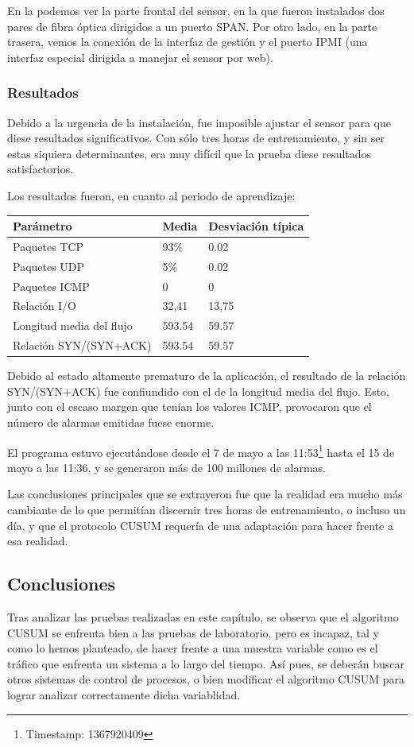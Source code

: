 En la  podemos ver la parte frontal del sensor, en la que fueron instalados dos pares de fibra 
óptica dirigidos a un puerto SPAN. Por otro lado, en la parte trasera, vemos la conexión de la interfaz de gestión y el 
puerto IPMI (una interfaz especial dirigida a manejar el sensor por web).

\subsubsection{Resultados}
Debido a la urgencia de la instalación, fue imposible ajustar el sensor para que diese resultados significativos. Con 
sólo tres horas de entrenamiento, y sin ser estas siquiera determinantes, era muy difícil que la prueba diese 
resultados satisfactorios.

Los resultados fueron, en cuanto al periodo de aprendizaje:
\begin{table}[htbp]
 \centering
 \begin {tabular}{lll}
  Parámetro & Media & Desviación típica  \\\hline
  Paquetes TCP & 93\% & 0.02 \\
  Paquetes UDP & 5\%  & 0.02 \\
  Paquetes ICMP & 0 & 0      \\
  Relación I/O & 32,41 & 13,75 \\
  Longitud media del flujo & 593.54 & 59.57 \\
  Relación SYN/(SYN+ACK) & 593.54 & 59.57   
 \end {tabular}
\end{table}

Debido al estado altamente prematuro de la aplicación, el resultado de la relación SYN/(SYN+ACK) fue confiundido con el 
de la longitud media del flujo. Esto, junto con el escaso margen que tenían los valores ICMP, provocaron que el número 
de alarmas emitidas fuese enorme. %

El programa estuvo ejecutándose desde el 7 de mayo a las 11:53\footnote{Timestamp: 1367920409} hasta el 15 de mayo a 
las 11:36, y se generaron más de 100 millones de alarmas.

Las conclusiones principales que se extrayeron fue que la realidad era mucho más cambiante de lo que permitían discernir 
tres horas de entrenamiento, o incluso un día, y que el protocolo CUSUM requería de una adaptación para hacer frente a esa 
realidad.

\subsection{Conclusiones}
Tras analizar las pruebas realizadas en este capítulo, se observa que el algoritmo CUSUM se enfrenta bien a las pruebas 
de laboratorio, pero es incapaz, tal y como lo hemos planteado, de hacer frente a una muestra variable como es el tráfico 
que enfrenta un sistema a lo largo del tiempo. Así pues, se deberán buscar otros sistemas de control de 
procesos, o bien modificar el algoritmo CUSUM para lograr analizar correctamente dicha variablidad.


\endinput
